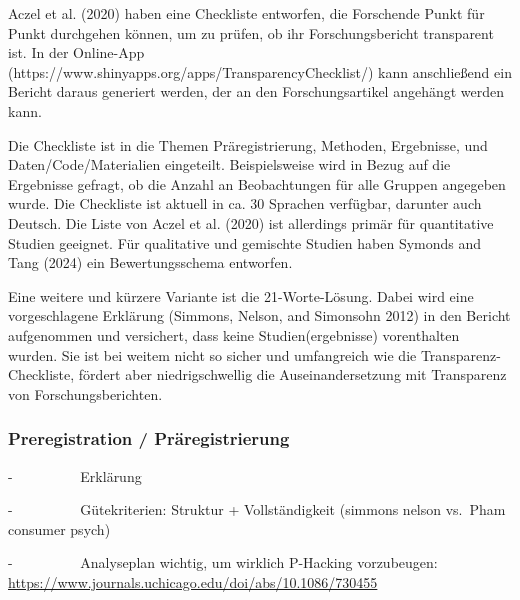 \documentclass[
  letterpaper,
  DIV=11,
  numbers=noendperiod]{scrreprt}
\begin{document}
\begin{tcolorbox}[enhanced jigsaw, title=\textcolor{quarto-callout-note-color}{\faInfo}\hspace{0.5em}{Transparenz-Checkliste}, colbacktitle=quarto-callout-note-color!10!white, rightrule=.15mm, titlerule=0mm, left=2mm, bottomrule=.15mm, arc=.35mm, leftrule=.75mm, toprule=.15mm, opacityback=0, breakable, bottomtitle=1mm, colframe=quarto-callout-note-color-frame, toptitle=1mm, opacitybacktitle=0.6, coltitle=black, colback=white]

Aczel et al. (2020) haben eine Checkliste entworfen, die Forschende
Punkt für Punkt durchgehen können, um zu prüfen, ob ihr
Forschungsbericht transparent ist. In der Online-App
(https://www.shinyapps.org/apps/TransparencyChecklist/) kann
anschließend ein Bericht daraus generiert werden, der an den
Forschungsartikel angehängt werden kann.

Die Checkliste ist in die Themen Präregistrierung, Methoden, Ergebnisse,
und Daten/Code/Materialien eingeteilt. Beispielsweise wird in Bezug auf
die Ergebnisse gefragt, ob die Anzahl an Beobachtungen für alle Gruppen
angegeben wurde. Die Checkliste ist aktuell in ca. 30 Sprachen
verfügbar, darunter auch Deutsch. Die Liste von Aczel et al. (2020) ist
allerdings primär für quantitative Studien geeignet. Für qualitative und
gemischte Studien haben Symonds and Tang (2024) ein Bewertungsschema
entworfen.

Eine weitere und kürzere Variante ist die 21-Worte-Lösung. Dabei wird
eine vorgeschlagene Erklärung (Simmons, Nelson, and Simonsohn 2012) in
den Bericht aufgenommen und versichert, dass keine Studien(ergebnisse)
vorenthalten wurden. Sie ist bei weitem nicht so sicher und umfangreich
wie die Transparenz-Checkliste, fördert aber niedrigschwellig die
Auseinandersetzung mit Transparenz von Forschungsberichten.

\end{tcolorbox}

\subsubsection{Preregistration /
Präregistrierung}\label{preregistration-pruxe4registrierung}

-~~~~~~~~~ Erklärung

-~~~~~~~~~ Gütekriterien: Struktur + Vollständigkeit (simmons nelson
vs.~Pham consumer psych)

-~~~~~~~~~ Analyseplan wichtig, um wirklich P-Hacking vorzubeugen:
\url{https://www.journals.uchicago.edu/doi/abs/10.1086/730455}
\end{document}
